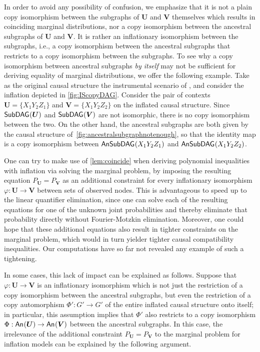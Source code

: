 \documentclass[aps,english,10pt,superscriptaddress,onecolumn,twoside,longbibliography,pra,floatfix,fleqn,nofootinbib]{revtex4-1}
\theoremstyle{definition}
\newcounter{example}[section]
\newcommand{\An}[2][]{{\mathsf{An}_{#1}}\parenths{#2}}
\newcommand{\SmallNamedFunction}[3][]{\operatorname{\mathsf{#2}}_{#1}\parenths{#3}}
\newcommand{\subgraph}[2][]{\SmallNamedFunction[#1]{SubDAG}{#2}}
\newcommand{\ansubgraph}[2][]{\SmallNamedFunction[#1]{AnSubDAG}{#2}}
\DeclarePairedDelimiter{\parenths}{\lparen}{\rparen}
\begin{document}
In order to avoid any possibility of confusion, we emphasize that it is not a plain copy isomorphism between the subgraphs of $\bm{U}$ and $\bm{V}$ themselves which results in coinciding marginal distributions, nor a copy isomorphism between the ancestral subgraphs of $\bm{U}$ and $\bm{V}$. It is rather an inflationary isomorphism between the subgraphs, i.e., a copy isomorphism between the ancestral subgraphs that restricts to a copy isomorphism between the subgraphs. To see why a copy isomorphism between ancestral subgraphs {\em by itself} may not be sufficient for deriving equality of marginal distributions, we offer the following example. Take as the original causal structure the instrumental scenario of \citet{pearl1995instrumental}, and consider the inflation depicted in \cref{fig:IScopyDAG}.  Consider the pair of contexts $\bm{U} = \{ X_1 Y_2 Z_1\}$ and $\bm{V}= \{ X_1 Y_2 Z_2\}$ on the inflated causal structure. Since $\subgraph{\bm{U}}$ and $\subgraph{\bm{V}}$ are not isomorphic, there is no copy isomorphism between the two. On the other hand, 
the ancestral subgraphs are both given by the causal structure of~\cref{fig:ancestralsubgraphnotenough}, so that the identity map is a copy isomorphism between $\ansubgraph{X_1 Y_2 Z_1}$ and $\ansubgraph{X_1 Y_2 Z_2}$.

One can try to make use of \cref{lem:coincide} when deriving polynomial inequalities with inflation via solving the marginal problem, by imposing the resulting equation $P_{\bm{U}} = P_{\bm{V}}$ as an additional constraint for every inflationary isomorphism $\varphi : \bm{U}\to\bm{V}$ between sets of observed nodes. This is advantageous to speed up to the linear quantifier elimination, since one can solve each of the resulting equations for one of the unknown joint probabilities and thereby eliminate that probability directly without Fourier-Motzkin elimination. Moreover, one could hope that these additional equations also result in tighter constraints on the marginal problem, which would in turn yielder tighter causal compatibility inequalities. Our computations have so far not revealed any example of such a tightening.

In some cases, this lack of impact can be explained as follows.
Suppose that $\varphi:\bm{U}\to\bm{V}$ is an inflationary isomorphism 
which is not just the restriction of a copy isomorphism between the ancestral subgraphs, but even the restriction of a copy automorphism 
$\Phi':G'\to G'$ of the entire inflated causal structure onto itself; in particular, this assumption implies that $\Phi'$ also restricts to a copy isomorphism $\Phi:\An{\bm{U}}\to\An{\bm{V}}$ between the ancestral subgraphs. In this case, the irrelevance of the additional constraint $P_{\bm{U}} = P_{\bm{V}}$ to the marginal problem for inflation models can be explained by the following argument. 
\end{document}
